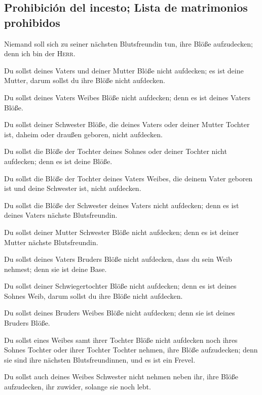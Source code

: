 \hypertarget{prohibiciuxf3n-del-incesto-lista-de-matrimonios-prohibidos}{%
\subsection{Prohibición del incesto; Lista de matrimonios
prohibidos}\label{prohibiciuxf3n-del-incesto-lista-de-matrimonios-prohibidos}}

 Niemand soll sich zu seiner nächsten Blutsfreundin tun,
ihre Blöße aufzudecken; denn ich bin der \textsc{Herr}.

 Du sollst deines Vaters und deiner Mutter Blöße nicht
aufdecken; es ist deine Mutter, darum sollst du ihre Blöße nicht
aufdecken.

 Du sollst deines Vaters Weibes Blöße nicht aufdecken;
denn es ist deines Vaters Blöße.

 Du sollst deiner Schwester Blöße, die deines Vaters oder
deiner Mutter Tochter ist, daheim oder draußen geboren, nicht aufdecken.

 Du sollst die Blöße der Tochter deines Sohnes oder
deiner Tochter nicht aufdecken; denn es ist deine Blöße.

 Du sollst die Blöße der Tochter deines Vaters Weibes,
die deinem Vater geboren ist und deine Schwester ist, nicht aufdecken.

 Du sollst die Blöße der Schwester deines Vaters nicht
aufdecken; denn es ist deines Vaters nächste Blutsfreundin.

 Du sollst deiner Mutter Schwester Blöße nicht aufdecken;
denn es ist deiner Mutter nächste Blutsfreundin.

 Du sollst deines Vaters Bruders Blöße nicht aufdecken,
dass du sein Weib nehmest; denn sie ist deine Base.

 Du sollst deiner Schwiegertochter Blöße nicht aufdecken;
denn es ist deines Sohnes Weib, darum sollst du ihre Blöße nicht
aufdecken.

 Du sollst deines Bruders Weibes Blöße nicht aufdecken;
denn sie ist deines Bruders Blöße.

 Du sollst eines Weibes samt ihrer Tochter Blöße nicht
aufdecken noch ihres Sohnes Tochter oder ihrer Tochter Tochter nehmen,
ihre Blöße aufzudecken; denn sie sind ihre nächsten Blutsfreundinnen,
und es ist ein Frevel.

 Du sollst auch deines Weibes Schwester nicht nehmen
neben ihr, ihre Blöße aufzudecken, ihr zuwider, solange sie noch lebt.

